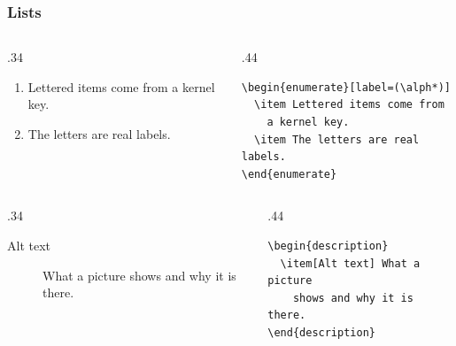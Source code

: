 \documentclass{ltx-talk}
\begin{document}
\begin{frame*}
  \frametitle{Lists}
  \begin{columns}
    \begin{column}{.34\textwidth}
      \begin{enumerate}[label=(\alph*)]
        \item Lettered items come from a kernel key.
        \item The letters are real labels.
      \end{enumerate}
    \end{column}
    \begin{column}{.44\textwidth}
\small
\begin{verbatim}
\begin{enumerate}[label=(\alph*)]
  \item Lettered items come from
    a kernel key.
  \item The letters are real labels.
\end{enumerate}
\end{verbatim}
    \end{column}
  \end{columns}

  \begin{columns}
    \begin{column}{.34\textwidth}
      \begin{description}
        \item[Alt text] What a picture shows and why it is there.
      \end{description}
    \end{column}
    \begin{column}{.44\textwidth}
\small
\begin{verbatim}
\begin{description}
  \item[Alt text] What a picture
    shows and why it is there.
\end{description}
\end{verbatim}
    \end{column}
  \end{columns}
\end{frame*}
\end{document}
